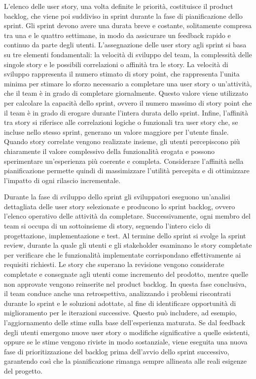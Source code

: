 \documentclass[12pt,a4paper,openright,twoside]{book}
\begin{document}
\vspace{1em}

L’elenco delle user story, una volta definite le priorità, costituisce il product backlog, che viene poi suddiviso in sprint durante la fase di pianificazione dello sprint. Gli sprint devono avere una durata breve e costante, solitamente compresa tra una e le quattro settimane, in modo da assicurare un feedback rapido e continuo da parte degli utenti. L'assegnazione delle user story agli sprint si basa su tre elementi fondamentali: la velocità di sviluppo del team, la complessità delle singole story e le possibili correlazioni o affinità tra le story. La velocità di sviluppo rappresenta il numero stimato di story point, che rappresenta l'unita minima per stimare lo sforzo necessario a completare una user story o un’attività, che il team è in grado di completare giornalmente. Questo valore viene utilizzato per calcolare la capacità dello sprint, ovvero il numero massimo di story point che il team è in grado di erogare durante l'intera durata dello sprint.  Infine, l'affinità tra story si riferisce alle correlazioni logiche o funzionali tra user story che, se incluse nello stesso sprint, generano un valore maggiore per l'utente finale. Quando story correlate vengono realizzate insieme, gli utenti percepiscono più chiaramente il valore complessivo della funzionalità erogata e possono sperimentare un'esperienza più coerente e completa. Considerare l'affinità nella pianificazione permette quindi di massimizzare l'utilità percepita e di ottimizzare l'impatto di ogni rilascio incrementale.

\vspace{1em}

Durante la fase di sviluppo dello sprint gli sviluppatori eseguono un'analisi dettagliata delle user story selezionate e producono lo sprint backlog, ovvero l'elenco operativo delle attività da completare. Successivamente, ogni membro del team si occupa di un sottoinsieme di story, seguendo l'intero ciclo di progettazione, implementazione e test. Al termine dello sprint si svolge la  sprint review, durante la quale gli utenti e gli stakeholder esaminano le story completate per verificare che le funzionalità implementate corrispondano effettivamente ai requisiti richiesti. Le story che superano la revisione vengono considerate completate e consegnate agli utenti come incremento del prodotto, mentre quelle non approvate vengono reinserite nel product backlog. In questa fase conclusiva, il team conduce anche una retrospettiva, analizzando i problemi riscontrati durante lo sprint e le soluzioni adottate, al fine di identificare opportunità di miglioramento per le iterazioni successive. Questo può includere, ad esempio, l'aggiornamento delle stime sulla base dell'esperienza maturata. Se dal feedback degli utenti emergono nuove user story o modifiche significative a quelle esistenti, oppure se le stime vengono riviste in modo sostanziale, viene eseguita una nuova fase di prioritizzazione del backlog prima dell'avvio dello sprint successivo, garantendo così che la pianificazione rimanga sempre allineata alle reali esigenze del progetto.
\end{document}
